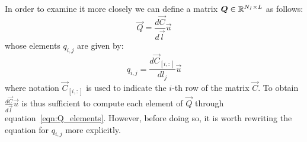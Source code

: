\medskip
In order to examine it more closely we can define a matrix $\boldsymbol{Q} \in \mathbb{R}^{N_I \times L}$ as follows:
\begin{equation}
	\label{eqn:Q_matrix_definition}
	\vec{Q} = \frac{d\vec{C}}{d\vec{l}} \vec{u}
\end{equation}
whose elements $q_{i,j}$ are given by:
\begin{equation}
	\label{eqn:Q_elements}
	q_{i,j} = \frac{d\vec{C}_{[i,:]}}{dl_j} \vec{u}
\end{equation}
where notation $\vec{C}_{[i,:]}$ is used to indicate the $i$-th row of the matrix $\vec{C}$.
To obtain $\frac{d\vec{C}}{d\vec{l}} \vec{u}$ is thus sufficient to compute each element of $\vec{Q}$ through equation~\eqref{eqn:Q_elements}. However, before doing so, it is worth rewriting the equation for $q_{i,j}$ more explicitly.

